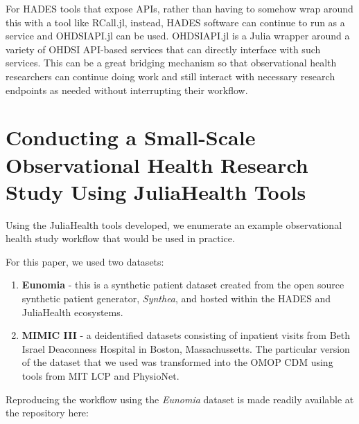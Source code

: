 \documentclass{juliacon}
\begin{document}
For HADES tools that expose APIs, rather than having to somehow wrap around this with a tool like RCall.jl, instead, HADES software can continue to run as a service and OHDSIAPI.jl can be used.
OHDSIAPI.jl is a Julia wrapper around a variety of OHDSI API-based services that can directly interface with such services.
This can be a great bridging mechanism so that observational health researchers can continue doing work and still interact with necessary research endpoints as needed without interrupting their workflow.

\section{Conducting a Small-Scale Observational Health Research Study Using JuliaHealth Tools}

Using the JuliaHealth tools developed, we enumerate an example observational health study workflow that would be used in practice.\footnotemark

For this paper, we used two datasets: 

\begin{enumerate}

\item \textbf{Eunomia} - this is a synthetic patient dataset created from the open source synthetic patient generator, \textit{Synthea}, and hosted within the HADES and JuliaHealth ecosystems. \cite{walonoski2018synthea}

\item \textbf{MIMIC III} - a deidentified datasets consisting of inpatient visits from Beth Israel Deaconness Hospital in Boston, Massachussetts.
The particular version of the dataset that we used was transformed into the OMOP CDM using tools from MIT LCP and PhysioNet. \cite{physionet, hripcsakCharacterizingTreatmentPathways2016, johnson2016mimic, johnson2018mimic}

\end{enumerate}

Reproducing the workflow using the \textit{Eunomia} dataset is made readily available at the repository here: \cite{schuemieEunomia2023}

\end{document}
